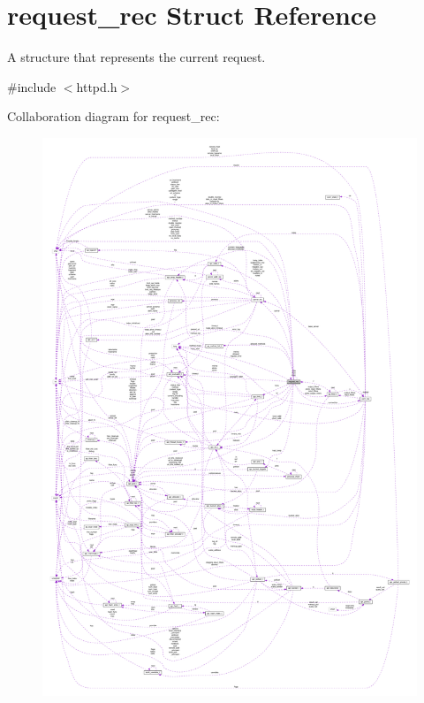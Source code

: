 \hypertarget{structrequest__rec}{}\section{request\+\_\+rec Struct Reference}
\label{structrequest__rec}


A structure that represents the current request.  




{\ttfamily \#include $<$httpd.\+h$>$}



Collaboration diagram for request\+\_\+rec\+:
\nopagebreak
\begin{figure}[H]
\begin{center}
\leavevmode
\includegraphics[width=350pt]{structrequest__rec__coll__graph}
\end{center}
\end{figure}
